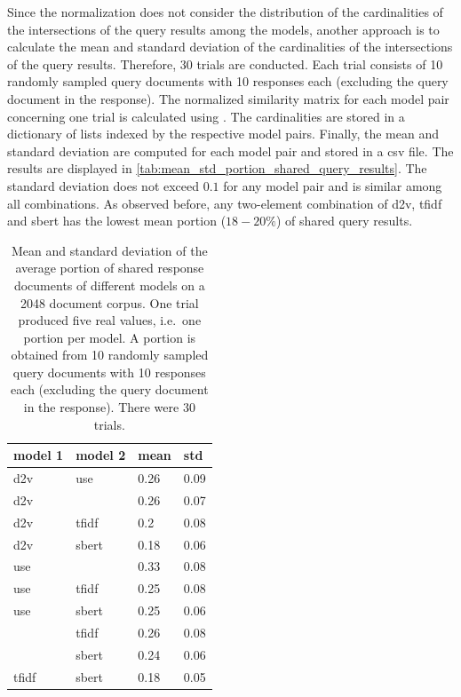 Since the normalization does not consider the distribution of the cardinalities of the intersections of the query results among the models,
another approach is to calculate the mean and standard deviation of the cardinalities of the intersections of the query results.
Therefore, 30 trials are conducted.
Each trial consists of 10 randomly sampled query documents with 10 responses each (excluding the query document in the response).
The normalized similarity matrix for each model pair concerning one trial is calculated using .
The cardinalities are stored in a dictionary of lists indexed by the respective model pairs.
Finally, the mean and standard deviation are computed for each model pair and stored in a \ac{csv} file.
The results are displayed in \autoref{tab:mean_std_portion_shared_query_results}.
The standard deviation does not exceed $0.1$ for any model pair and is similar among all combinations.
As observed before, any two-element combination of \ac{d2v}, \ac{tfidf} and \ac{sbert} has the lowest mean portion ($18-20\%$) of shared query results.

\begin{table}[]
    \centering
    \caption{Mean and standard deviation of the average portion of shared response documents of different models on a 2048 document corpus.
    One trial produced five real values, i.e.\ one portion per model.
    A portion is obtained from 10 randomly sampled query documents with 10 responses each (excluding the query document in the response).
    There were 30 trials.
    }
    \begin{tabular}{|l|l|l|l|}
    \hline
    \rowcolor[HTML]{C0C0C0} 
    \textbf{model 1} & \textbf{model 2} & \textbf{mean} & \textbf{std} \\ \hline
    \ac{d2v}          & \ac{use}        & 0.26          & 0.09         \\ \hline
    \ac{d2v}          & \infersent{}            & 0.26          & 0.07         \\ \hline
    \ac{d2v}          & \ac{tfidf}            & 0.2           & 0.08         \\ \hline
    \ac{d2v}          & \ac{sbert}          & 0.18          & 0.06         \\ \hline
    \ac{use}        & \infersent{}            & 0.33          & 0.08         \\ \hline
    \ac{use}        & \ac{tfidf}            & 0.25          & 0.08         \\ \hline
    \ac{use}        & \ac{sbert}          & 0.25          & 0.06         \\ \hline
    \infersent{}            & \ac{tfidf}            & 0.26          & 0.08         \\ \hline
    \infersent{}            & \ac{sbert}          & 0.24          & 0.06         \\ \hline
    \ac{tfidf}            & \ac{sbert}          & 0.18          & 0.05         \\ \hline
    \end{tabular}
    \label{tab:mean_std_portion_shared_query_results}
\end{table}



